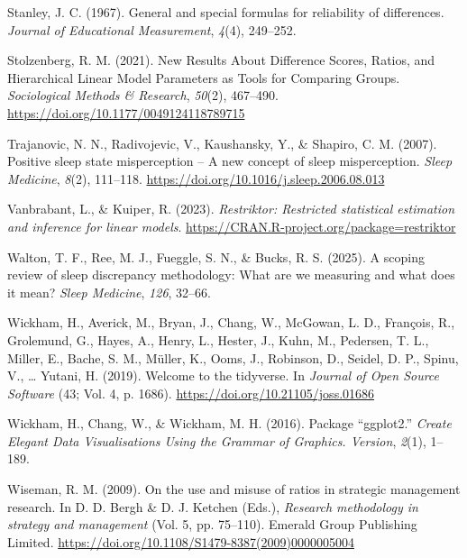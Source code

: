 \documentclass[
]{article}
\newlength{\cslhangindent}
\newenvironment{CSLReferences}[2] %
 {\begin{list}{}{%
  \setlength{\itemindent}{0pt}
  \setlength{\leftmargin}{0pt}
  \setlength{\parsep}{0pt}
  \ifodd #1
   \setlength{\leftmargin}{\cslhangindent}
   \setlength{\itemindent}{-1\cslhangindent}
  \fi
  \setlength{\itemsep}{#2\baselineskip}}}
 {\end{list}}
\begin{document}
\begin{CSLReferences}{1}{0}
Stanley, J. C. (1967). General and special formulas for reliability of differences. \emph{Journal of Educational Measurement}, \emph{4}(4), 249--252.

Stolzenberg, R. M. (2021). New {Results} {About} {Difference} {Scores}, {Ratios}, and {Hierarchical} {Linear} {Model} {Parameters} as {Tools} for {Comparing} {Groups}. \emph{Sociological Methods \& Research}, \emph{50}(2), 467--490. \url{https://doi.org/10.1177/0049124118789715}

Trajanovic, N. N., Radivojevic, V., Kaushansky, Y., \& Shapiro, C. M. (2007). Positive sleep state misperception -- {A} new concept of sleep misperception. \emph{Sleep Medicine}, \emph{8}(2), 111--118. \url{https://doi.org/10.1016/j.sleep.2006.08.013}

Vanbrabant, L., \& Kuiper, R. (2023). \emph{Restriktor: Restricted statistical estimation and inference for linear models}. \url{https://CRAN.R-project.org/package=restriktor}

Walton, T. F., Ree, M. J., Fueggle, S. N., \& Bucks, R. S. (2025). A scoping review of sleep discrepancy methodology: What are we measuring and what does it mean? \emph{Sleep Medicine}, \emph{126}, 32--66.

Wickham, H., Averick, M., Bryan, J., Chang, W., McGowan, L. D., François, R., Grolemund, G., Hayes, A., Henry, L., Hester, J., Kuhn, M., Pedersen, T. L., Miller, E., Bache, S. M., Müller, K., Ooms, J., Robinson, D., Seidel, D. P., Spinu, V., \ldots{} Yutani, H. (2019). Welcome to the {tidyverse}. In \emph{Journal of Open Source Software} (43; Vol. 4, p. 1686). \url{https://doi.org/10.21105/joss.01686}

Wickham, H., Chang, W., \& Wickham, M. H. (2016). Package {``ggplot2.''} \emph{Create Elegant Data Visualisations Using the Grammar of Graphics. Version}, \emph{2}(1), 1--189.

Wiseman, R. M. (2009). {On the use and misuse of ratios in strategic management research}. In D. D. Bergh \& D. J. Ketchen (Eds.), \emph{Research methodology in strategy and management} (Vol. 5, pp. 75--110). Emerald Group Publishing Limited. \url{https://doi.org/10.1108/S1479-8387(2009)0000005004}


\end{CSLReferences}
\end{document}
